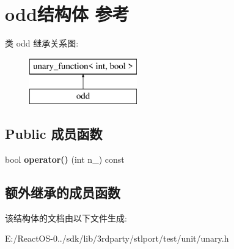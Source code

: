 \hypertarget{structodd}{}\section{odd结构体 参考}
\label{structodd}
类 odd 继承关系图\+:\begin{figure}[H]
\begin{center}
\leavevmode
\includegraphics[height=2.000000cm]{structodd}
\end{center}
\end{figure}
\subsection*{Public 成员函数}
\begin{DoxyCompactItemize}
\item 
\mbox{\label{structodd_a2f5f0be55ee92125e5732a34322db3a9}} 
bool {\bfseries operator()} (int n\+\_\+) const
\end{DoxyCompactItemize}
\subsection*{额外继承的成员函数}


该结构体的文档由以下文件生成\+:\begin{DoxyCompactItemize}
\item 
E\+:/\+React\+O\+S-\/0../sdk/lib/3rdparty/stlport/test/unit/unary.\+h\end{DoxyCompactItemize}
